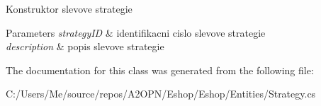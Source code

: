 Konstruktor slevove strategie 


\begin{DoxyParams}{Parameters}
{\em strategy\+ID} & identifikacni cislo slevove strategie\\
\hline
{\em description} & popis slevove strategie\\
\hline
\end{DoxyParams}


The documentation for this class was generated from the following file\+:\begin{DoxyCompactItemize}
\item 
C\+:/\+Users/\+Me/source/repos/\+A2\+O\+P\+N/\+Eshop/\+Eshop/\+Entities/Strategy.\+cs\end{DoxyCompactItemize}
